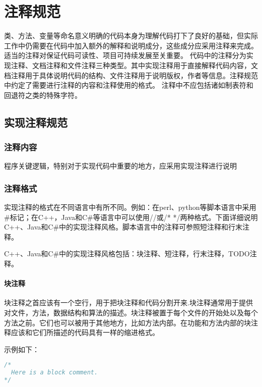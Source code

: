 
\chapter{注释规范}
\label{chap02}

类、方法、变量等命名意义明确的代码本身为理解代码打下了良好的基础，但实际工作中仍需要在代码中加入额外的解释和说明成分，这些成分应采用注释来完成。适当的注释对保证代码可读性、项目可持续发展至关重要。
代码中的注释分为实现注释、文档注释和文件注释三种类型。其中实现注释用于直接解释代码内容，文档注释用于具体说明代码的结构、文件注释用于说明版权，作者等信息。注释规范中约定了需要进行注释的内容和注释使用的格式。
注释中不应包括诸如制表符和回退符之类的特殊字符。

\section{实现注释规范}

\subsection{注释内容}

程序关键逻辑，特别对于实现代码中重要的地方，应采用实现注释进行说明

\subsection{注释格式}

实现注释的格式在不同语言中有所不同。例如：在perl、python等脚本语言中采用\#标记；在C++，Java和C\#等语言中可以使用//或/* */两种格式。下面详细说明C++、Java和C\#中的实现注释风格。脚本语言中的注释可参照短注释和行末注释。

C++、Java和C\#中的实现注释风格包括：块注释、短注释，行末注释，TODO注释。

\subsubsection{块注释}

块注释之首应该有一个空行，用于把块注释和代码分割开来.块注释通常用于提供对文件，方法，数据结构和算法的描述。块注释被置于每个文件的开始处以及每个方法之前。它们也可以被用于其他地方，比如方法内部。在功能和方法内部的块注释应该和它们所描述的代码具有一样的缩进格式。

示例如下：

\begin{lstlisting}[language=c]
/*
  Here is a block comment.
*/
\end{lstlisting}



